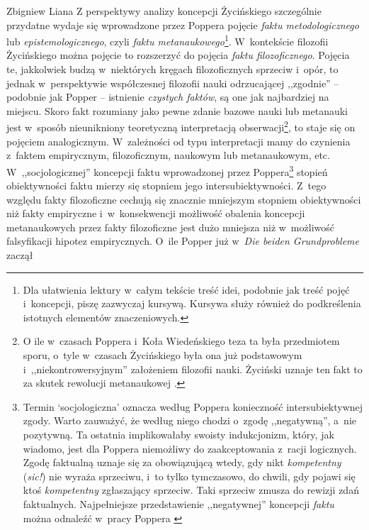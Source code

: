 \begin{artplenv}{Zbigniew Liana}
Z perspektywy analizy koncepcji Życińskiego szczególnie przydatne wydaje się wprowadzone przez Poppera pojęcie
\textit{faktu metodologicznego} lub \textit{epistemologicznego}, czyli \textit{faktu metanaukowego}\footnote{Dla ułatwienia
lektury w~całym tekście treść idei, podobnie jak treść pojęć i~koncepcji, piszę zazwyczaj kursywą. Kursywa służy
również do podkreślenia istotnych elementów znaczeniowych.}. W~kontekście filozofii Życińskiego można pojęcie to
rozszerzyć do pojęcia \textit{faktu filozoficznego}. Pojęcia te, jakkolwiek budzą w~niektórych kręgach filozoficznych
sprzeciw i~opór, to jednak w~perspektywie współczesnej filozofii nauki odrzucającej ,,zgodnie'' -- podobnie jak Popper --
istnienie \textit{czystych faktów}, są one jak najbardziej na miejscu. Skoro fakt rozumiany jako pewne zdanie bazowe
nauki lub metanauki jest w~sposób nieunikniony teoretyczną interpretacją obserwacji\footnote{O ile w~czasach Poppera i~Koła
Wiedeńskiego teza ta była przedmiotem sporu, o~tyle w~czasach Życińskiego była ona już podstawowym i~,,niekontrowersyjnym''
założeniem filozofii nauki. Życiński uznaje ten fakt to za skutek rewolucji metanaukowej
\parencite[zob.][s.~127]{zycinski_elementy_1996}.
}, to staje się on pojęciem analogicznym. W~zależności od
typu interpretacji mamy do czynienia z~faktem empirycznym, filozoficznym, naukowym lub metanaukowym,
etc. W~,,socjologicznej'' koncepcji faktu wprowadzonej przez Poppera\footnote{Termin `socjologiczna' oznacza według Poppera
konieczność intersubiektywnej zgody. Warto zauważyć, że według niego chodzi o~zgodę ,,negatywną'', a~nie pozytywną. Ta
ostatnia implikowałaby swoisty indukcjonizm, który, jak wiadomo, jest dla Poppera niemożliwy do zaakceptowania z~racji
logicznych. Zgodę faktualną uznaje się za obowiązującą wtedy, gdy nikt \textit{kompetentny} (\textit{sic!}) nie wyraża
sprzeciwu, i~to tylko tymczasowo, do chwili, gdy pojawi się ktoś \textit{kompetentny} zgłaszający sprzeciw. Taki sprzeciw
zmusza do rewizji zdań faktualnych. Najpełniejsze przedstawienie ,,negatywnej'' koncepcji \textit{faktu} można odnaleźć w~pracy Poppera
\parencite*[s.~122–135, zwł. 131n.]{popper_beiden_1979}
} stopień obiektywności faktu mierzy się stopniem
jego intersubiektywności. Z~tego względu fakty filozoficzne cechują się znacznie mniejszym stopniem obiektywności niż
fakty empiryczne i~w~konsekwencji możliwość obalenia koncepcji metanaukowych przez fakty filozoficzne jest dużo
mniejsza niż w~możliwość falsyfikacji hipotez empirycznych. O~ile Popper już w~\textit{Die beiden Grundprobleme} zaczął

\end{artplenv}
